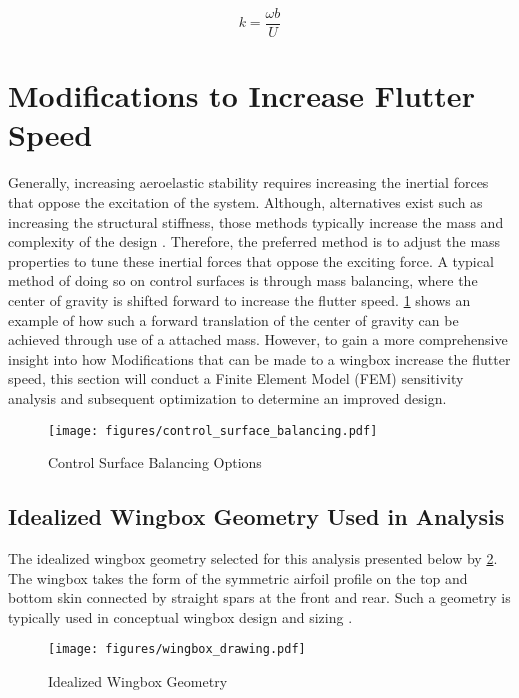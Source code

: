 \begin{equation*}
    \label{eq:reduced_frequency}
    k = \frac{\omega b}{U}
\end{equation*}

\section{Modifications to Increase Flutter Speed}
Generally, increasing aeroelastic stability requires increasing the inertial
forces that oppose the excitation of the system. Although, alternatives exist
such as increasing the structural stiffness, those methods typically increase
the mass and complexity of the design
\autocite[p.15]{bontonMeasuringMassProperties2000}. Therefore, the preferred
method is to adjust the mass properties to tune these inertial forces that
oppose the exciting force. A typical method of doing so on control surfaces is
through mass balancing, where the center of gravity is shifted forward to
increase the flutter speed. \cref{fig:aileron_balancing} shows an example of
how such a forward translation of the center of gravity can be achieved through
use of a attached mass. However, to gain a more comprehensive insight into how
Modifications that can be made to a wingbox increase the flutter speed, this
section will conduct a Finite Element Model (FEM) sensitivity analysis and
subsequent optimization to determine an improved design.

\begin{figure}[H]
    \centering
    \texttt{[image: figures/control\_surface\_balancing.pdf]}
    \caption{
        Control Surface Balancing Options
        \autocite{bingelisControlSurfaceBalancing}
    }
    \label{fig:aileron_balancing}
\end{figure}

\subsection{Idealized Wingbox Geometry Used in Analysis}
The idealized wingbox geometry selected for this analysis presented below
by \cref{fig:wingbox_geometry}. The wingbox takes the form of the symmetric
airfoil profile on the top and bottom skin connected by straight spars at
the front and rear. Such a geometry is typically used in conceptual wingbox
design and sizing \autocite[p.540]{ajajConceptualWingboxWeight2013}.

\begin{figure}[H]
    \centering
    \texttt{[image: figures/wingbox\_drawing.pdf]}
    \caption{Idealized Wingbox Geometry}
    \label{fig:wingbox_geometry}
\end{figure}

